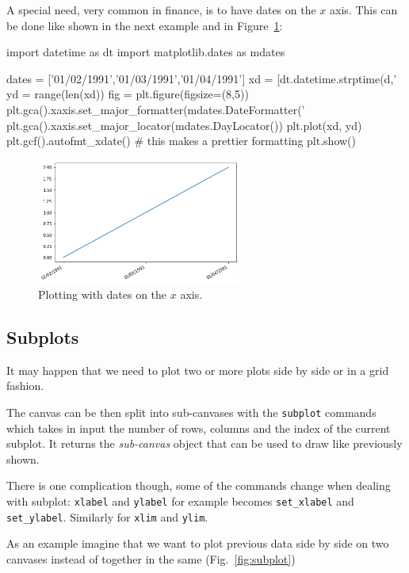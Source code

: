 \begin{ipython}
A special need, very common in finance, is to have dates on the \(x\)
axis. This can be done like shown in the next example and in Figure~\ref{fig:axis3}:

\begin{ipython}
import datetime as dt
import matplotlib.dates as mdates

dates = ['01/02/1991','01/03/1991','01/04/1991']
xd = [dt.datetime.strptime(d,'%
yd = range(len(xd))
fig = plt.figure(figsize=(8,5))
plt.gca().xaxis.set_major_formatter(mdates.DateFormatter('%
plt.gca().xaxis.set_major_locator(mdates.DayLocator())
plt.plot(xd, yd)
plt.gcf().autofmt_xdate() # this makes a prettier formatting
plt.show()
\end{ipython}

\begin{figure}[h]
	\centering
	\includegraphics[width=0.6\textwidth]{figures/axis3}
	\caption{Plotting with dates on the $x$ axis.}
	\label{fig:axis3}
\end{figure}

\subsection{Subplots}
\label{subplots}

It may happen that we need to plot two or more plots side by side or in
a grid fashion.

The canvas can be then split into sub-canvases with the \texttt{subplot}
commands which takes in input the number of rows, columns and the index
of the current subplot. It returns the \emph{sub-canvas} object that can
be used to draw like previously shown.

There is one complication though, some of the commands change when
dealing with subplot: \texttt{xlabel} and \texttt{ylabel} for example
becomes \texttt{set\_xlabel} and \texttt{set\_ylabel}. Similarly for
\texttt{xlim} and \texttt{ylim}.

As an example imagine that we want to plot previous data side by
side on two canvases instead of together in the same (Fig.~\ref{fig:subplot})


\end{ipython}
